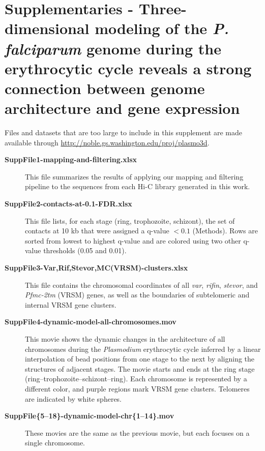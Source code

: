 
\chapter[Supplementary material for
Genome architecture of the \emph{P. falciparum}]{Supplementaries - Three-dimensional modeling of the {\em P. falciparum} genome during
the erythrocytic cycle reveals a strong connection between genome
architecture and gene expression} %

\graphicspath{{8_plasmodium_supplementaries/}}

\begin{center}
\begin{flushleft}

Files and datasets that are too large to include in this supplement are made available through \url{http://noble.gs.washington.edu/proj/plasmo3d}.

\begin{description}
    \item[\textbf{SuppFile1-mapping-and-filtering.xlsx}] This file summarizes the
        results of applying our mapping and filtering pipeline to the sequences from
        each Hi-C library generated in this work.

    \item[\textbf{SuppFile2-contacts-at-0.1-FDR.xlsx}] This file lists, for each stage
        (ring, trophozoite, schizont), the set of contacts at 10 kb that were assigned
        a q-value $< 0.1$ (Methods). Rows are sorted from lowest to highest q-value and
        are colored using two other q-value thresholds (0.05 and 0.01).

    \item[\textbf{SuppFile3-Var,Rif,Stevor,MC(VRSM)-clusters.xlsx}] This file contains
        the chromosomal coordinates of all \emph{var}, \emph{rifin}, \emph{stevor}, and
        \emph{Pfmc-2tm} (VRSM) genes, as well as the boundaries of subtelomeric and internal
        VRSM gene clusters.

    \item[\textbf{SuppFile4-dynamic-model-all-chromosomes.mov}] This movie
        shows the dynamic changes in the architecture of all chromosomes during
        the \emph{Plasmodium} erythrocytic cycle inferred by a linear interpolation
        of bead positions from one stage to the next by aligning the structures
        of adjacent stages. The movie starts and ends at the ring stage
        (ring--trophozoite--schizont--ring). Each chromosome is represented
        by a different color, and purple regions mark VRSM gene clusters.
        Telomeres are indicated by white spheres.

    \item[\textbf{SuppFile\{5--18\}-dynamic-model-chr\{1--14\}.mov}]
        These movies are the same as the previous movie, but each focuses on a single chromosome.
\end{description}
\end{flushleft}
\end{center}

